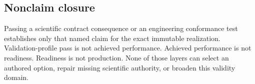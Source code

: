 \subsection{Nonclaim closure}

Passing a scientific contract consequence or an engineering conformance test establishes
only that named claim for the exact immutable realization. Validation-profile
pass is not achieved performance. Achieved performance is not readiness.
Readiness is not production. None of those layers can select an authored
option, repair missing scientific authority, or broaden this validity domain.
